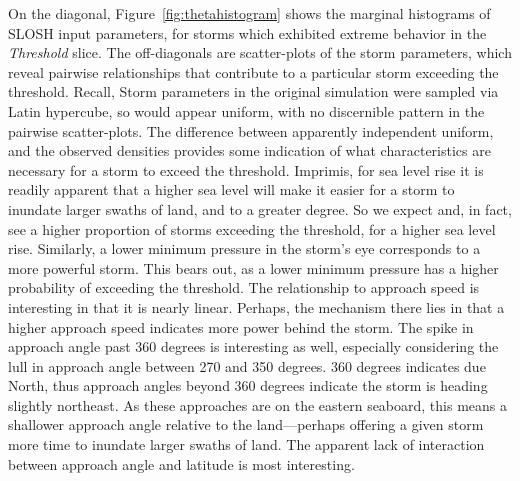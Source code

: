 On the diagonal, Figure~\ref{fig:thetahistogram} shows the marginal histograms  
    of SLOSH input parameters, for storms which exhibited extreme behavior in the \emph{Threshold} 
    slice.  The off-diagonals are scatter-plots of the storm parameters, which reveal pairwise
    relationships that contribute to a particular storm exceeding the threshold.  Recall,
    Storm parameters in the original simulation were sampled via Latin hypercube, so would appear 
    uniform, with no discernible pattern in the pairwise scatter-plots.  The difference between 
    apparently independent uniform, and the observed densities provides some indication of what 
    characteristics are necessary for a storm to exceed the threshold. Imprimis, for sea level 
    rise it is readily apparent that a higher sea level will make it easier for a storm to 
    inundate larger swaths of land, and to a greater degree.  So we expect and, in fact, 
    see a higher proportion of storms exceeding the threshold, for a higher sea level rise.  
    Similarly, a lower minimum pressure in the storm's eye corresponds to a more powerful 
    storm.  This bears out, as a lower minimum pressure has a higher probability of exceeding 
    the threshold. The relationship to approach speed is interesting in that it is nearly 
    linear.  Perhaps, the mechanism there lies in that a higher
    approach speed indicates more power behind the storm.  The spike in approach angle past 
    360 degrees is interesting as well, especially considering the lull in approach angle 
    between 270 and 350 degrees. 360 degrees indicates due North, thus approach angles
    beyond 360 degrees indicate the storm is heading slightly northeast. As these approaches 
    are on the eastern seaboard, this means a shallower approach angle relative to the
    land---perhaps offering a given storm more time to inundate larger swaths of land.  The 
    apparent lack of interaction between approach angle and latitude is most interesting.

